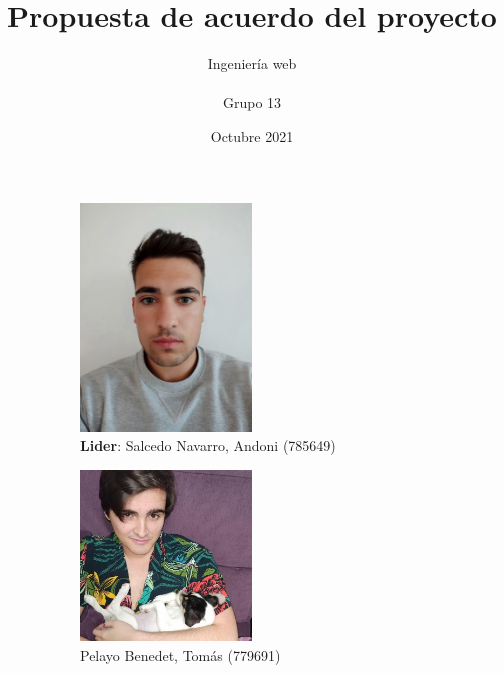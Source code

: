 \documentclass{article}
\title{Propuesta de acuerdo del proyecto}
\author{Ingeniería web\\\\Grupo 13}
\date{Octubre 2021}
\begin{document}
 
\maketitle
 
\begin{figure}[H]
    \captionsetup[subfigure]{justification=centering}
     \begin{subfigure}[b]{0.49\textwidth}
        \centering
         \includegraphics[width=0.5\textwidth]{../images/Andoni.jpeg}
         \caption*{\textbf{Lider}: Salcedo Navarro, Andoni (785649)}
     \end{subfigure}
     \hfill
     \begin{subfigure}[b]{0.49\textwidth}
        \centering
        \includegraphics[width=0.5\textwidth]{../images/Tomas.jpeg}
        \caption*{Pelayo Benedet, Tomás (779691)}
     \end{subfigure}
     \hfill
     \begin{subfigure}[b]{0.49\textwidth}
        \centering

\end{subfigure}
\end{figure}
\end{document}
